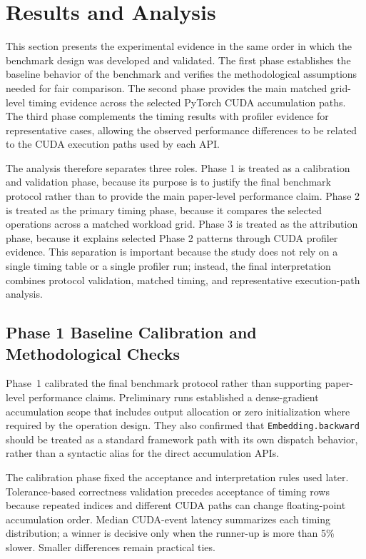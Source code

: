 \section{Results and Analysis}
\label{sec:results-analysis}

This section presents the experimental evidence in the same order in which the benchmark design was developed and validated. The first phase establishes the baseline behavior of the benchmark and verifies the methodological assumptions needed for fair comparison. The second phase provides the main matched grid-level timing evidence across the selected PyTorch CUDA accumulation paths. The third phase complements the timing results with profiler evidence for representative cases, allowing the observed performance differences to be related to the CUDA execution paths used by each API.

The analysis therefore separates three roles. Phase 1 is treated as a calibration and validation phase, because its purpose is to justify the final benchmark protocol rather than to provide the main paper-level performance claim. Phase 2 is treated as the primary timing phase, because it compares the selected operations across a matched workload grid. Phase 3 is treated as the attribution phase, because it explains selected Phase 2 patterns through CUDA profiler evidence. This separation is important because the study does not rely on a single timing table or a single profiler run; instead, the final interpretation combines protocol validation, matched timing, and representative execution-path analysis.

\subsection{Phase 1 Baseline Calibration and Methodological Checks}

Phase~1 calibrated the final benchmark protocol rather than supporting paper-level performance claims. Preliminary runs established a dense-gradient accumulation scope that includes output allocation or zero initialization where required by the operation design. They also confirmed that \texttt{Embedding.backward} should be treated as a standard framework path with its own dispatch behavior, rather than a syntactic alias for the direct accumulation APIs.

The calibration phase fixed the acceptance and interpretation rules used later. Tolerance-based correctness validation precedes acceptance of timing rows because repeated indices and different CUDA paths can change floating-point accumulation order. Median CUDA-event latency summarizes each timing distribution; a winner is decisive only when the runner-up is more than 5\% slower. Smaller differences remain practical ties.

